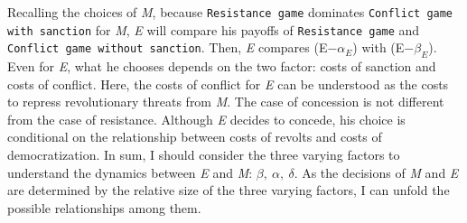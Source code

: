 \documentclass[11pt]{article}
\begin{document}
Recalling the choices of \textit{M}, because \texttt{Resistance game} dominates \texttt{Conflict game with sanction} for \textit{M}, \textit{E} will compare his payoffs of \texttt{Resistance game} and \texttt{Conflict game without sanction}. Then, \textit{E} compares (E$-\alpha_{E}$) with (E$-\beta_{E}$). Even for \textit{E}, what he chooses depends on the two factor: costs of sanction and costs of conflict. Here, the costs of conflict for \textit{E} can be understood as the costs to repress revolutionary threats from \textit{M}. The case of concession is not different from the case of resistance. Although \textit{E} decides to concede, his choice is conditional on the relationship between costs of revolts and costs of democratization. In sum, I should consider the three varying factors to understand the dynamics between \textit{E} and \textit{M}: $\beta, \: \alpha, \: \delta$. As the decisions of \textit{M} and \textit{E} are determined by the relative size of the three varying factors, I can unfold the possible relationships among them.
\end{document}
